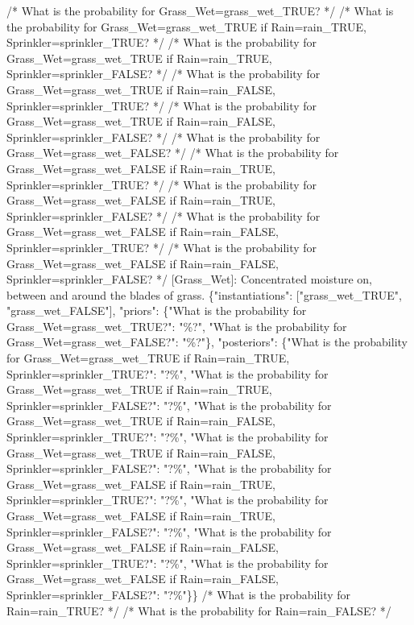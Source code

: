 \documentclass[
  11pt,
  letterpaper,
]{book}
\newenvironment{Shaded}{\begin{snugshade}}{\end{snugshade}}
\newcommand{\InformationTok}[1]{\textcolor[rgb]{0.37,0.37,0.37}{#1}}
\begin{document}
\begin{landscape}
\begin{Shaded}
\begin{Highlighting}[]
\InformationTok{    /* What is the probability for Grass\_Wet=grass\_wet\_TRUE? */}
\InformationTok{    /* What is the probability for Grass\_Wet=grass\_wet\_TRUE if Rain=rain\_TRUE, Sprinkler=sprinkler\_TRUE? */}
\InformationTok{    /* What is the probability for Grass\_Wet=grass\_wet\_TRUE if Rain=rain\_TRUE, Sprinkler=sprinkler\_FALSE? */}
\InformationTok{    /* What is the probability for Grass\_Wet=grass\_wet\_TRUE if Rain=rain\_FALSE, Sprinkler=sprinkler\_TRUE? */}
\InformationTok{    /* What is the probability for Grass\_Wet=grass\_wet\_TRUE if Rain=rain\_FALSE, Sprinkler=sprinkler\_FALSE? */}
\InformationTok{    /* What is the probability for Grass\_Wet=grass\_wet\_FALSE? */}
\InformationTok{    /* What is the probability for Grass\_Wet=grass\_wet\_FALSE if Rain=rain\_TRUE, Sprinkler=sprinkler\_TRUE? */}
\InformationTok{    /* What is the probability for Grass\_Wet=grass\_wet\_FALSE if Rain=rain\_TRUE, Sprinkler=sprinkler\_FALSE? */}
\InformationTok{    /* What is the probability for Grass\_Wet=grass\_wet\_FALSE if Rain=rain\_FALSE, Sprinkler=sprinkler\_TRUE? */}
\InformationTok{    /* What is the probability for Grass\_Wet=grass\_wet\_FALSE if Rain=rain\_FALSE, Sprinkler=sprinkler\_FALSE? */}
\InformationTok{    [Grass\_Wet]: Concentrated moisture on, between and around the blades of grass. \{"instantiations": ["grass\_wet\_TRUE", "grass\_wet\_FALSE"], "priors": \{"What is the probability for Grass\_Wet=grass\_wet\_TRUE?": "\%?", "What is the probability for Grass\_Wet=grass\_wet\_FALSE?": "\%?"\}, "posteriors": \{"What is the probability for Grass\_Wet=grass\_wet\_TRUE if Rain=rain\_TRUE, Sprinkler=sprinkler\_TRUE?": "?\%", "What is the probability for Grass\_Wet=grass\_wet\_TRUE if Rain=rain\_TRUE, Sprinkler=sprinkler\_FALSE?": "?\%", "What is the probability for Grass\_Wet=grass\_wet\_TRUE if Rain=rain\_FALSE, Sprinkler=sprinkler\_TRUE?": "?\%", "What is the probability for Grass\_Wet=grass\_wet\_TRUE if Rain=rain\_FALSE, Sprinkler=sprinkler\_FALSE?": "?\%", "What is the probability for Grass\_Wet=grass\_wet\_FALSE if Rain=rain\_TRUE, Sprinkler=sprinkler\_TRUE?": "?\%", "What is the probability for Grass\_Wet=grass\_wet\_FALSE if Rain=rain\_TRUE, Sprinkler=sprinkler\_FALSE?": "?\%", "What is the probability for Grass\_Wet=grass\_wet\_FALSE if Rain=rain\_FALSE, Sprinkler=sprinkler\_TRUE?": "?\%", "What is the probability for Grass\_Wet=grass\_wet\_FALSE if Rain=rain\_FALSE, Sprinkler=sprinkler\_FALSE?": "?\%"\}\}}
\InformationTok{        /* What is the probability for Rain=rain\_TRUE? */}
\InformationTok{        /* What is the probability for Rain=rain\_FALSE? */}

\end{Highlighting}
\end{Shaded}
\end{landscape}
\end{document}
